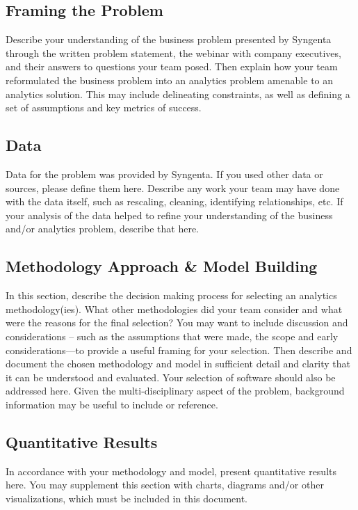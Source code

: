 \documentclass[11pt]{article} %
\begin{document}
\subsection*{Framing the Problem}

Describe your understanding of the business problem presented by Syngenta 
through the written problem statement, the webinar with company executives, 
and their answers to questions your team posed. Then explain how your team 
reformulated the business problem into an analytics problem amenable to an 
analytics solution. This may include delineating constraints, as well as 
defining a set of assumptions and key metrics of success. 

\subsection*{Data}

Data for the problem was provided by Syngenta. If you used other data or 
sources, please define them here. Describe any work your team may have done 
with the data itself, such as rescaling, cleaning, identifying 
relationships, etc. If your analysis of the data helped to refine your 
understanding of the business and/or analytics problem, describe that here.

\subsection*{Methodology Approach \& Model Building}

In this section, describe the decision making process for selecting an 
analytics methodology(ies). What other methodologies did your team consider 
and what were the reasons for the final selection? You may want to include 
discussion and considerations -- such as the assumptions that were made, the 
scope and early considerations---to provide a useful framing for your 
selection. Then describe and document the chosen methodology and model in 
sufficient detail and clarity that it can be understood and evaluated. Your 
selection of software should also be addressed here. Given the 
multi-disciplinary aspect of the problem, background information may be 
useful to include or reference.

\subsection*{Quantitative Results}

In accordance with your methodology and model, present quantitative results 
here. You may supplement this section with charts, diagrams and/or other 
visualizations, which must be included in this document. 
\end{document}
